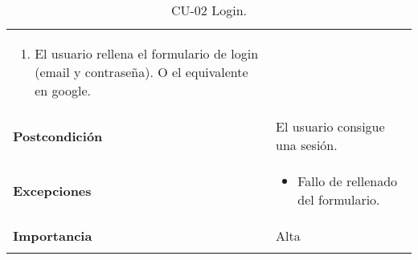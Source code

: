 \begin{longtable}[H]{@{}ll@{}}
\begin{minipage}[t]{0.68\columnwidth}
\begin{enumerate}
\def\labelenumi{\arabic{enumi}.}
\tightlist
\item
  El usuario rellena el formulario de login (email y contraseña). O el equivalente en google.
\end{enumerate}\strut
\end{minipage}\tabularnewline
\begin{minipage}[t]{0.26\columnwidth}\raggedright\strut
\textbf{Postcondición}\strut
\end{minipage} & \begin{minipage}[t]{0.68\columnwidth}\raggedright\strut%
El usuario consigue una sesión.\strut
\end{minipage}\tabularnewline
\begin{minipage}[t]{0.26\columnwidth}\raggedright\strut
\textbf{Excepciones}\strut
\end{minipage} & \begin{minipage}[t]{0.68\columnwidth}\raggedright\strut%
\begin{itemize}
\tightlist
\item
  Fallo de rellenado del formulario.
\end{itemize}\strut
\end{minipage}\tabularnewline
\begin{minipage}[t]{0.26\columnwidth}\raggedright\strut
\textbf{Importancia}\strut
\end{minipage} & \begin{minipage}[t]{0.68\columnwidth}\raggedright\strut%
Alta\strut
\end{minipage}\tabularnewline
\bottomrule%
\caption{CU-02 Login.}
\end{longtable}


